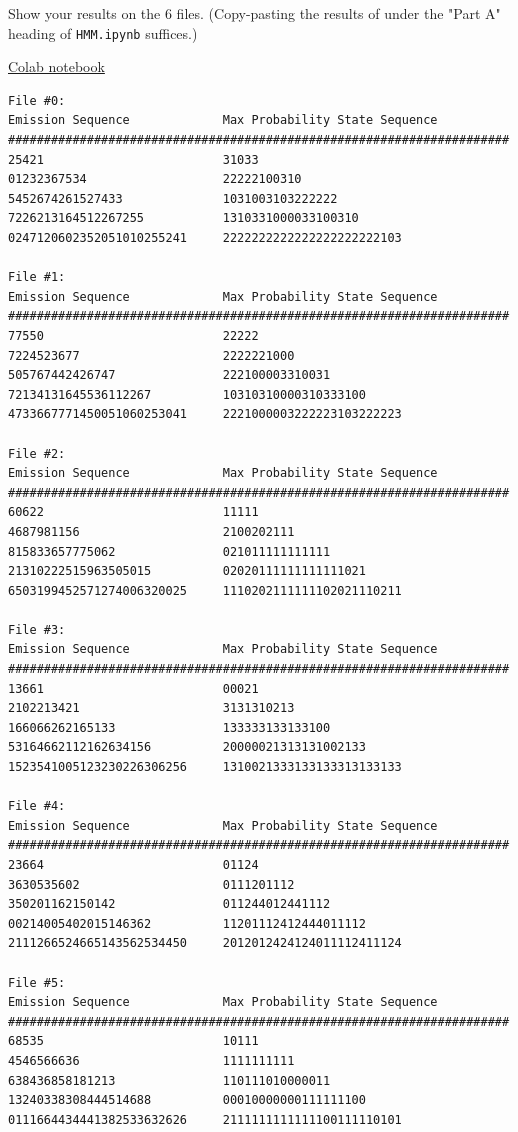 Show your results on the 6 files. (Copy-pasting the results of under the "Part A" heading of \texttt{HMM.ipynb} suffices.)
\begin{solution}
  \href{https://drive.google.com/file/d/1CgGDvZ95ua7JDxOb4WkoU3T8oF0RCYgW/view?usp=sharing}{Colab notebook}

  \begin{verbatim}
File #0:
Emission Sequence             Max Probability State Sequence
######################################################################
25421                         31033                         
01232367534                   22222100310                   
5452674261527433              1031003103222222              
7226213164512267255           1310331000033100310           
0247120602352051010255241     2222222222222222222222103     

File #1:
Emission Sequence             Max Probability State Sequence
######################################################################
77550                         22222                         
7224523677                    2222221000                    
505767442426747               222100003310031               
72134131645536112267          10310310000310333100          
4733667771450051060253041     2221000003222223103222223     

File #2:
Emission Sequence             Max Probability State Sequence
######################################################################
60622                         11111                         
4687981156                    2100202111                    
815833657775062               021011111111111               
21310222515963505015          02020111111111111021          
6503199452571274006320025     1110202111111102021110211     

File #3:
Emission Sequence             Max Probability State Sequence
######################################################################
13661                         00021                         
2102213421                    3131310213                    
166066262165133               133333133133100               
53164662112162634156          20000021313131002133          
1523541005123230226306256     1310021333133133313133133     

File #4:
Emission Sequence             Max Probability State Sequence
######################################################################
23664                         01124                         
3630535602                    0111201112                    
350201162150142               011244012441112               
00214005402015146362          11201112412444011112          
2111266524665143562534450     2012012424124011112411124     

File #5:
Emission Sequence             Max Probability State Sequence
######################################################################
68535                         10111                         
4546566636                    1111111111                    
638436858181213               110111010000011               
13240338308444514688          00010000000111111100          
0111664434441382533632626     2111111111111100111110101
  \end{verbatim}
\end{solution}
